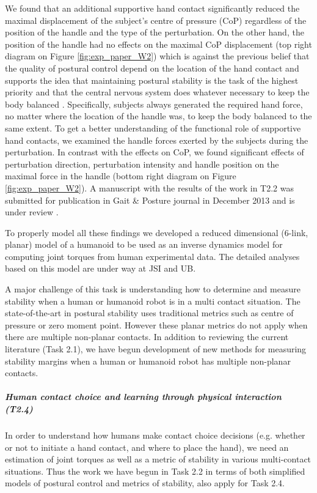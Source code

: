 We found that an additional supportive hand contact significantly reduced the maximal displacement of the subject's centre of pressure (CoP) regardless of the position of the handle and the type of the perturbation. On the other hand, the position of the handle had no effects on the maximal CoP displacement (top right diagram on Figure \ref{fig:exp_paper_W2}) which is against the previous belief that the quality of postural control depend on the location of the hand contact \cite{Sarraf2014} and supports the idea that maintaining postural stability is the task of the highest priority and that the central nervous system does whatever necessary to keep the body balanced \cite{Winter1995}. Specifically, subjects always generated the required hand force, no matter where the location of the handle was, to keep the body balanced to the same extent. To get a better understanding of the functional role of supportive hand contacts, we examined the handle forces exerted by the subjects during the perturbation. In contrast with the effects on CoP, we found significant effects of perturbation direction, perturbation intensity and handle position on the maximal force in the handle (bottom right diagram on Figure \ref{fig:exp_paper_W2}). A manuscript with the results of the work in T2.2 was submitted for publication in Gait \& Posture journal in December 2013 and is under review \cite{Babic2014}.

To properly model all these findings we developed a reduced dimensional (6-link, planar) model of a humanoid to be used as an inverse dynamics model for computing joint torques from human experimental data. The detailed analyses based on this model are under way at JSI and UB.

A major challenge of this task is understanding how to determine and measure stability when a human or humanoid robot is in a multi contact situation. The state-of-the-art in postural stability uses traditional metrics such as centre of pressure or zero moment point. However these planar metrics do not apply when there are multiple non-planar contacts. In addition to reviewing the current literature (Task 2.1), we have begun development of new methods for measuring stability margins when a human or humanoid robot has multiple non-planar contacts.

\subparagraph{Human contact choice and learning through physical interaction (T2.4)}

In order to understand how humans make contact choice decisions (e.g. whether or not to initiate a hand contact, and where to place the hand), we need an estimation of joint torques as well as a metric of stability in various multi-contact situations. Thus the work we have begun in Task 2.2 in terms of both simplified models of postural control and metrics of stability, also apply for Task 2.4.

